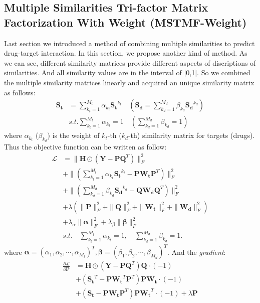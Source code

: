 \documentclass{article}
\begin{document}
\subsection{Multiple Similarities Tri-factor Matrix Factorization With Weight (MSTMF-Weight)}
Last section we introduced a method of combining multiple similarities to predict drug-target interaction. In this section, we propose another kind of method. As we can see,  different similarity matrices provide different aspects of discriptions of similarities. And all similarity values are in the interval of [0,1]. So we combined the multiple similarity matrices linearly and acquired an unique similarity matrix as follows:
\begin{equation}
\begin{split}
\bm{S_t}&=\sum_{k_t=1}^{M_t}\alpha_{k_t}\bm{S_t}^{k_t}\quad( \bm{S_d}=\sum_{k_d=1}^{M_d}\beta_{k_d}\bm{S_d}^{k_d}) \\
&s.t. \sum_{k_t=1}^{M_t}\alpha_{k_t}=1\quad (\sum_{k_d=1}^{M_d}\beta_{k_d}=1)
\end{split}
\end{equation}
where $\alpha_{k_t}$ ($\beta_{k_d}$) is the weight of $k_t$-th ($k_d$-th) similarity matrix for targets (drugs). \cite{zheng2013collaborative} \\
Thus the objective function can be written as follow:
\begin{equation} %
\begin{split}
\mathcal{L} &= \|\bm{H}\odot(\bm{Y}-\bm{P}\bm{Q}^T)\|_F^2 \\
&+\|(\sum_{k_t=1}^{M_t}\alpha_{k_t}\bm{S_t}^{k_t}-\bm{PW_t}\bm{P}^T)\|_F^2 \\
&+\|(\sum_{k_d=1}^{M_d}\beta_{k_d}\bm{S_d}^{k_d}-\bm{QW_d}\bm{Q}^T)\|_F^2 \\
&+ \lambda(\|\bm{P}\|_F^2+\|\bm{Q}\|_F^2+\|\bm{W_t}\|_F^2+\|\bm{W_d}\|_F^2)\\
&+\lambda_\alpha\|\bm{\alpha}\|_F^2+\lambda_\beta\|\bm{\beta}\|_F^2\\
&s.t.\quad \sum_{k_t=1}^{M_t}\alpha_{k_t}=1,\quad \sum_{k_d=1}^{M_d}\beta_{k_d}=1.
\end{split}
\end{equation}
where $\bm{\alpha}=(\alpha_1,\alpha_2,\cdots,\alpha_{M_t})^T, \bm{\beta}=(\beta_1,\beta_2,\cdots,\beta_{M_d})^T$.
And the \textit{gradient}:\\
\begin{equation} %
\begin{split}
\frac {\partial \mathcal{L}}{\partial \bm{P}} &=\bm{H}\odot(\bm{Y}-\bm{P}\bm{Q}^T)\bm{Q}\cdot(-1)\\
&+ (\bm{S_t}^T-\bm{P}\bm{W_t}^T\bm{P}^T)\bm{P}\bm{W_t}\cdot(-1)\\
&+ (\bm{S_t}-\bm{P}\bm{W_t}\bm{P}^T)\bm{P}\bm{W_t}^T\cdot(-1) + \lambda \bm{P}\\
\end{split}
\end{equation}
\end{document}
